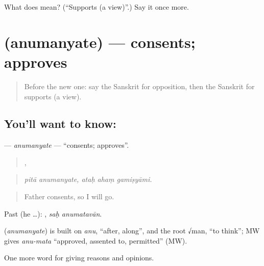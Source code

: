 \begin{tcolorbox}[breakable,colback=teal!4,colframe=teal!35!black,title={Before you move on}]
What does  mean? (\textquotedblleft{}Supports (a view)\textquotedblright{}.) Say it once more.
\end{tcolorbox}
\section[\texorpdfstring{\sk{अनुमन्यते} (anumanyate)}{अनुमन्यते (anumanyate)}]{ (anumanyate) — consents; approves}

\label{lesson:SA-C344-anumanyate}



\begin{quote}
Before the new one: say the Sanskrit for opposition, then the Sanskrit for supports (a view).
\end{quote}

\subsection*{You'll want to know: }
\textbf{} — \emph{anumanyate} — \textquotedblleft{}consents; approves\textquotedblright{}.

\begin{quote}
 ,   
\end{quote}

\begin{quote}
\emph{pitā anumanyate, ataḥ ahaṃ gamiṣyāmi.}
\end{quote}

\begin{quote}
Father consents, so I will go.
\end{quote}

Past (he …):  , \emph{saḥ anumatavān}.

\begin{cousinweb}
\textbf{} (\emph{anumanyate}) is built on \emph{anu}, \textquotedblleft{}after, along\textquotedblright{}, and the root √man, \textquotedblleft{}to think\textquotedblright{}; MW gives \emph{anu-mata} \textquotedblleft{}approved, assented to, permitted\textquotedblright{} (MW).
\end{cousinweb}

\begin{grammarlens}[title={What you've built}]
One more word for giving reasons and opinions.
\end{grammarlens}

